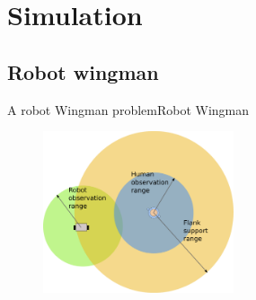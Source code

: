 \section{Simulation}

\subsection{Robot wingman}

\begin{frame}{A robot Wingman problem}{Robot Wingman}

\begin{figure}
\centering
\includegraphics[width = 0.5\textwidth]{./figure/Wingman}
\end{figure}

\end{frame}


